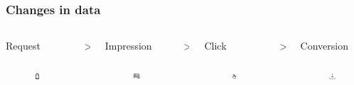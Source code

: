 \documentclass[intlimits, 9pt, unicode]{beamer}
\begin{document}
\begin{frame}
    \frametitle{Changes in data}

       \begin{columns}
    \begin{column}{0.25\textwidth}
    \centering
     Request
     \begin{figure}
	\includegraphics[height=1cm]{images/scheme_request}
     \end{figure}
     \end{column}
    \begin{column}{0.001\textwidth}
    \centering
	>
     \end{column}
    \begin{column}{0.25\textwidth}
    \centering
    Impression
     \begin{figure}
	\includegraphics[height=1cm]{images/scheme_impression}
     \end{figure}
    \end{column}
    \begin{column}{0.001\textwidth}
    \centering
    >
    \end{column}
    \begin{column}{0.25\textwidth}
    \centering
    Click
     \begin{figure}
	\includegraphics[height=1cm]{images/scheme_click}
     \end{figure}
    \end{column}
    \begin{column}{0.001\textwidth}
    \centering
    >
    \end{column}
    \begin{column}{0.25\textwidth}
    \centering
     Conversion
     \begin{figure}
	\includegraphics[height=1cm]{images/scheme_conversion}
     \end{figure}
     \end{column}
     \end{columns}


\end{frame}
\end{document}
